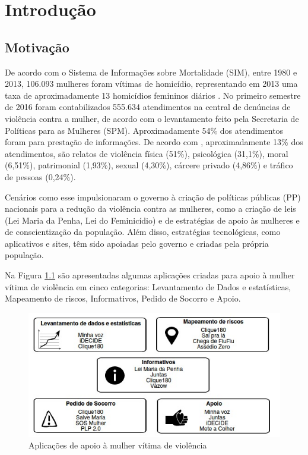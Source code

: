 \chapter[Introdução]{Introdução}

\section{Motivação}
De acordo com o Sistema de Informações sobre Mortalidade (SIM), entre 1980 e 2013, 106.093 mulheres foram vítimas de homicídio, representando em 2013 uma taxa de aproximadamente 13 homicídios femininos
diários \cite{mapa_violencia_2015}. 
No primeiro semestre de 2016 foram contabilizados 555.634 atendimentos na central de denúncias 
de violência contra a mulher, de acordo com o levantamento feito pela Secretaria de Políticas para as Mulheres (SPM). 
Aproximadamente 54\% dos atendimentos foram para prestação de informações. De acordo com \cite{portal_180}, aproximadamente 13\% dos atendimentos, são relatos de violência física (51\%), psicológica (31,1\%), moral (6,51\%), patrimonial (1,93\%), sexual (4,30\%), cárcere privado (4,86\%) e tráfico de pessoas (0,24\%).

Cenários como esse impulsionaram o governo à criação de políticas públicas (PP) 
nacionais para a redução da violência contra as mulheres, como a criação de leis (Lei Maria da Penha, Lei do Feminicídio)
e de estratégias de apoio às mulheres e de conscientização da população. Além disso, estratégias tecnológicas, como aplicativos e sites, têm sido apoiadas pelo governo e criadas pela própria população. 

Na Figura \ref{fig:sistemas_categorizados} são apresentadas algumas aplicações criadas para apoio à mulher vítima
de violência em cinco categorias: Levantamento de Dados e estatísticas, Mapeamento de riscos, Informativos, Pedido de Socorro e Apoio.

\begin{figure}[ht]
\centering
\includegraphics[scale=0.85]{figuras/sistemas_relacionados.jpeg}
\caption{Aplicações de apoio à mulher vítima de violência}
\label{fig:sistemas_categorizados}
\end{figure}

